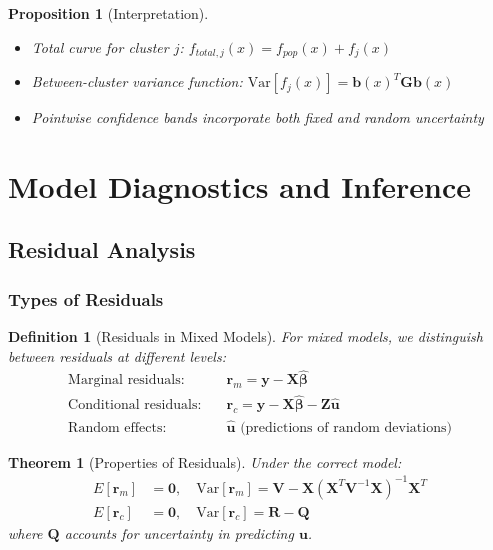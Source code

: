 \documentclass{article}
\newtheorem{definition}{Definition}
\newtheorem{theorem}{Theorem}
\newtheorem{proposition}{Proposition}
\begin{document}
\begin{proposition}[Interpretation]
\begin{itemize}
    \item Total curve for cluster $j$: $f_{total,j}(x) = f_{pop}(x) + f_j(x)$
    \item Between-cluster variance function: $\text{Var}[f_j(x)] = \mathbf{b}(x)^T\mathbf{G}\mathbf{b}(x)$
    \item Pointwise confidence bands incorporate both fixed and random uncertainty
\end{itemize}
\end{proposition}

\section{Model Diagnostics and Inference}

\subsection{Residual Analysis}

\subsubsection{Types of Residuals}

\begin{definition}[Residuals in Mixed Models]
For mixed models, we distinguish between residuals at different levels:
\begin{align}
\text{Marginal residuals}: & \quad \mathbf{r}_m = \mathbf{y} - \mathbf{X}\hat{\boldsymbol{\beta}} \\
\text{Conditional residuals}: & \quad \mathbf{r}_c = \mathbf{y} - \mathbf{X}\hat{\boldsymbol{\beta}} - \mathbf{Z}\hat{\mathbf{u}} \\
\text{Random effects}: & \quad \hat{\mathbf{u}} \text{ (predictions of random deviations)}
\end{align}
\end{definition}

\begin{theorem}[Properties of Residuals]
Under the correct model:
\begin{align}
E[\mathbf{r}_m] &= \mathbf{0}, \quad \text{Var}[\mathbf{r}_m] = \mathbf{V} - \mathbf{X}(\mathbf{X}^T\mathbf{V}^{-1}\mathbf{X})^{-1}\mathbf{X}^T \\
E[\mathbf{r}_c] &= \mathbf{0}, \quad \text{Var}[\mathbf{r}_c] = \mathbf{R} - \mathbf{Q}
\end{align}
where $\mathbf{Q}$ accounts for uncertainty in predicting $\mathbf{u}$.
\end{theorem}
\end{document}
